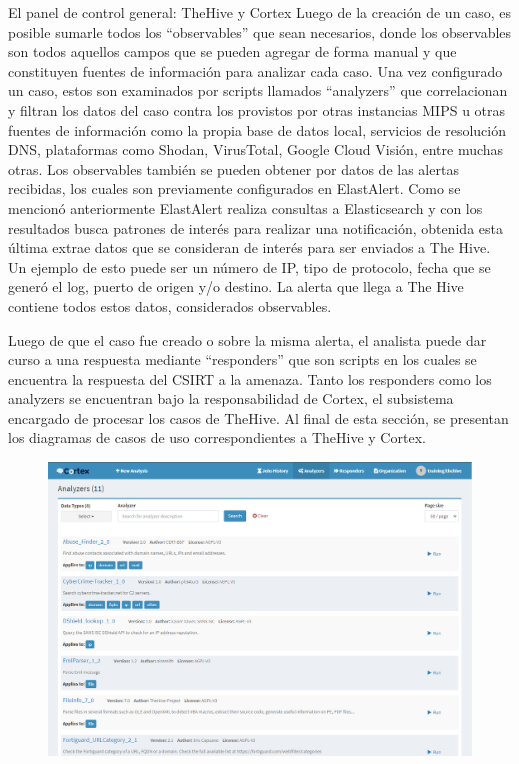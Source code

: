 \begin{section}{El panel de control general: TheHive y Cortex}
     Luego de la creación de un caso, es posible sumarle todos los “observables” que sean necesarios, donde los observables son todos aquellos campos que se pueden agregar de forma manual y que constituyen fuentes de información para analizar cada caso. Una vez configurado un caso, estos son examinados por scripts llamados “analyzers” que correlacionan y filtran los datos del caso contra los provistos por otras instancias MIPS u otras fuentes de información como la propia base de datos local, servicios de resolución DNS, plataformas como Shodan\cite{shodan}, VirusTotal\cite{virustotal}, Google Cloud Visión\cite{vision-AI}, entre muchas otras. Los observables también se pueden obtener por datos de las alertas recibidas, los cuales son previamente configurados en ElastAlert. Como se mencionó anteriormente ElastAlert realiza consultas a Elasticsearch y con los resultados busca patrones de interés para realizar una notificación, obtenida esta última extrae datos que se consideran de interés para ser enviados a The Hive. Un ejemplo de esto puede ser un número de IP, tipo de protocolo, fecha que se generó el log, puerto de origen y/o destino. La alerta que llega a The Hive contiene todos estos datos, considerados observables. \par
     Luego de que el caso fue creado o sobre la misma alerta, el analista puede dar curso a una respuesta mediante “responders” que son scripts en los cuales se encuentra la respuesta del CSIRT a la amenaza. Tanto los responders como los analyzers se encuentran bajo la responsabilidad de Cortex, el subsistema encargado de procesar los casos de TheHive. Al final de esta sección, se presentan los diagramas de casos de uso correspondientes a TheHive y Cortex.
     \begin{figure}[H]
        \centering
        \includegraphics[width=1\textwidth]{./iteracion_1_imagenes/figura_26_analyzers_disponibles.png}

\end{figure}
\end{section}
